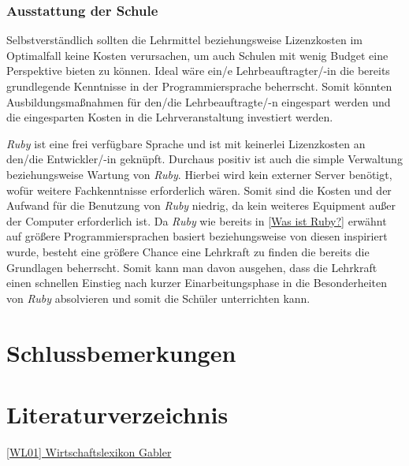 \documentclass[12pt,DIV=14, version=first, BCOR=10mm,a4paper,twoside,parskip=half-,headsepline,headinclude]{scrartcl}
\begin{document}
\subsubsection{Ausstattung der Schule}
\begin{flushleft}
Selbstverständlich sollten die Lehrmittel beziehungsweise Lizenzkosten im Optimalfall keine Kosten verursachen, um auch Schulen mit wenig Budget eine Perspektive bieten zu können. Ideal wäre ein/e Lehrbeauftragter/-in die bereits grundlegende Kenntnisse in der Programmiersprache beherrscht. Somit könnten Ausbildungsmaßnahmen für den/die Lehrbeauftragte/-n eingespart werden und die eingesparten Kosten in die Lehrveranstaltung investiert werden.

\textit{\glqq Ruby\grqq} ist eine frei verfügbare Sprache und ist mit keinerlei Lizenzkosten an den/die Entwickler/-in geknüpft. Durchaus positiv ist auch die simple Verwaltung beziehungsweise Wartung von \textit{\glqq Ruby\grqq}. Hierbei wird kein externer Server benötigt, wofür weitere Fachkenntnisse erforderlich wären. Somit sind die Kosten und der Aufwand für die Benutzung von \textit{\glqq Ruby\grqq} niedrig, da kein weiteres Equipment außer der Computer erforderlich ist. Da \textit{\glqq Ruby\grqq} wie bereits in \ref{Was ist Ruby?} erwähnt auf größere Programmiersprachen basiert beziehungsweise von diesen inspiriert wurde, besteht eine größere Chance eine Lehrkraft zu finden die bereits die Grundlagen beherrscht. Somit kann man davon ausgehen, dass die Lehrkraft einen schnellen Einstieg nach kurzer Einarbeitungsphase in die Besonderheiten von \textit{\glqq Ruby\grqq} absolvieren und somit die Schüler unterrichten kann.
\end{flushleft}


\section{Schlussbemerkungen}
\begin{flushleft} 

\end{flushleft}

\pagebreak

\section{Literaturverzeichnis}
\begin{flushleft}
\href{https://wirtschaftslexikon.gabler.de/definition/objektorientierung-43907} {[WL01] Wirtschaftslexikon Gabler}
\end{flushleft}
\end{document}
